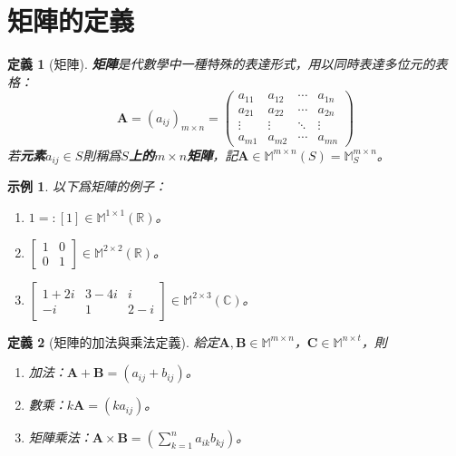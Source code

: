 \documentclass[12pt]{article}
\newtheorem{definition}{定義}
\newtheorem*{example}{示例}
\begin{document}
    \section*{矩陣的定義}

    \begin{definition}[矩陣]
        \textbf{矩陣}是代數學中一種特殊的表達形式，用以同時表達多位元的表格：$$\mathbf{A}=(a_{ij})_{m\times n}=\begin{pmatrix}
            a_{11}&a_{12}&\cdots&a_{1n}\\
            a_{21}&a_{22}&\cdots&a_{2n}\\
            \vdots&\vdots&\ddots&\vdots\\
            a_{m1}&a_{m2}&\cdots&a_{mn}
        \end{pmatrix}$$
        若\textbf{元素}$a_{ij}\in S$則稱爲\textbf{$S$上的$m\times n$矩陣}，記$\mathbf{A}\in \mathbb{M}^{m\times n}(S)=\mathbb{M}_S^{m\times n}$。
    \end{definition}

    \begin{example}
        以下爲矩陣的例子：
        \begin{enumerate}
            \item $1=:[1]\in\mathbb{M}^{1\times 1}(\mathbb{R})$。
            \item $\begin{bmatrix}
                1&0\\0&1
            \end{bmatrix}\in\mathbb{M}^{2\times 2}(\mathbb{R})$。
            \item $\begin{bmatrix}
                1+2i&3-4i&i\\-i&1&2-i
            \end{bmatrix}\in\mathbb{M}^{2\times 3}(\mathbb{C})$。
        \end{enumerate}
        
    \end{example}

    \begin{definition}[矩陣的加法與乘法定義]
        給定$\mathbf{A},\mathbf{B}\in\mathbb{M}^{m\times n}$，$\mathbf{C}\in\mathbb{M}^{n\times t}$，則\begin{enumerate}
            \item 加法：$\mathbf{A}+\mathbf{B}=(a_{ij}+b_{ij})$。
            \item 數乘：$k\mathbf{A}=(ka_{ij})$。
            \item 矩陣乘法：$\mathbf{A}\times\mathbf{B}=(\sum_{k=1}^{n}a_{ik}b_{kj})$。
        \end{enumerate}
    \end{definition}
\end{document}
